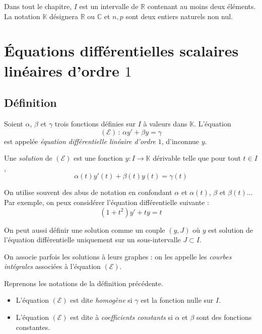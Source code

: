 \documentclass[a4paper,10pt]{report}
\begin{document}


\noindent Dans tout le chapitre, $I$ est un intervalle de $\mathbb{R}$ contenant au moins deux éléments. La notation $\mathbb{K}$ désignera $\mathbb{R}$ ou $\mathbb{C}$ et $n,p$ sont deux entiers naturels non nul.

\section{Équations différentielles scalaires linéaires d'ordre $1$}
\subsection{Définition} 

\begin{defin} Soient $\alpha$, $\beta$ et $\gamma$ trois fonctions définies sur $I$ à valeurs dans $\mathbb{K}$. L'équation 
$$ (\mathcal{E}) \, : \, \alpha y'+\beta y= \gamma$$
est appelée \textit{équation différentielle linéaire d'ordre} $1$, d'inconnue $y$.

\noindent Une \textit{solution} de $(\mathcal{E})$ est une fonction $y : I \rightarrow \mathbb{K}$ dérivable telle que pour tout $t \in I$,
$$ \alpha(t)y'(t)+\beta(t)y(t) = \gamma(t)$$
\end{defin}

\begin{rems}
\item On utilise souvent des abus de notation en confondant $\alpha$ et $\alpha(t)$, $\beta$ et $\beta(t)$... Par exemple, on peux considérer l'équation différentielle suivante :
$$ (1+t^2)y'+ty=t$$
\item On peut aussi définir une solution comme un couple $(y,J)$ où $y$ est solution de l'équation différentielle uniquement sur un sous-intervalle $J \subset I$.
\item On associe parfois les solutions à leurs graphes : on les appelle les \textit{courbes intégrales} associées à l'équation $(\mathcal{E})$.
\end{rems}

\medskip

\begin{defin} Reprenons les notations de la définition précédente.

\begin{itemize}
\item L'équation $(\mathcal{E})$ est dite \textit{homogène} si $\gamma$ est la fonction nulle sur $I$.
\item L'équation $(\mathcal{E})$ est dite à \textit{coefficients constants} si $\alpha$ et $\beta$ sont des fonctions constantes.
\end{itemize}
\end{defin}
\end{document}
